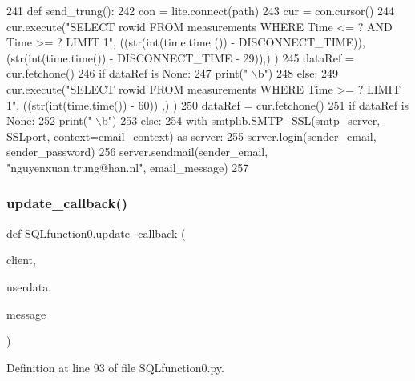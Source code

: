 \begin{DoxyCode}
241 \textcolor{keyword}{def }send_trung():
242     con = lite.connect(path)
243     cur = con.cursor()
244     cur.execute(\textcolor{stringliteral}{"SELECT rowid FROM measurements WHERE Time <= ? AND Time >= ? LIMIT 1"}, ((str(int(time.time
      ()) - DISCONNECT\_TIME)),(str(int(time.time()) - DISCONNECT\_TIME - 29)),) )
245     dataRef = cur.fetchone()
246     \textcolor{keywordflow}{if} dataRef \textcolor{keywordflow}{is} \textcolor{keywordtype}{None}:
247         print(\textcolor{stringliteral}{" \(\backslash\)b"})
248     \textcolor{keywordflow}{else}:
249         cur.execute(\textcolor{stringliteral}{"SELECT rowid FROM measurements WHERE Time >= ? LIMIT 1"}, ((str(int(time.time()) - 60))
      ,) )
250         dataRef = cur.fetchone()
251         \textcolor{keywordflow}{if} dataRef \textcolor{keywordflow}{is} \textcolor{keywordtype}{None}:
252             print(\textcolor{stringliteral}{" \(\backslash\)b"})
253         \textcolor{keywordflow}{else}:
254             with smtplib.SMTP\_SSL(smtp\_server, SSLport, context=email\_context) \textcolor{keyword}{as} server:
255                 server.login(sender\_email, sender\_password)                    
256                 server.sendmail(sender\_email, \textcolor{stringliteral}{"nguyenxuan.trung@han.nl"}, email\_message)
257 
\end{DoxyCode}
\mbox{\label{namespace_s_q_lfunction0_a4874edbbc1d9bf43987045a6b1132ace}} 
\subsubsection{update\+\_\+callback()}
{\footnotesize\ttfamily def S\+Q\+Lfunction0.\+update\+\_\+callback (\begin{DoxyParamCaption}\item[{}]{client,  }\item[{}]{userdata,  }\item[{}]{message }\end{DoxyParamCaption})}



Definition at line 93 of file S\+Q\+Lfunction0.\+py.


